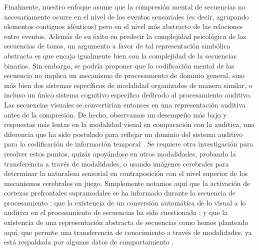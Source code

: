 Finalmente, nuestro enfoque asume que la compresión mental de secuencias no necesariamente ocurre en el nivel de los eventos sensoriales (es decir, agrupando elementos contiguos idénticos) pero en el nivel más abstracto de las relaciones entre eventos. Además de su éxito en predecir la complejidad psicológica de las secuencias de tonos, un argumento a favor de tal representación simbólica abstracta es que encaja igualmente bien con la complejidad de la secuencias binarias. Sin embargo, se podría proponer que la codificación mental de las secuencia no implica un mecanismo de procesamiento de dominio general, sino más bien dos sistemas específicos de modalidad organizados de manera similar, o incluso un único sistema cognitivo específica dedicado al procesamiento auditivo. Las secuencias visuales se convertirían entonces en una representación auditiva antes de la compresión. De hecho, observamos un desempeño más bajo y respuestas más lentas en la modalidad visual en comparación con la auditiva, una diferencia que ha sido postulado para reflejar un dominio del sistema auditivo para la codificación de información temporal \cite{f91,f118,f119}. Se requiere otra investigación para resolver estos puntos, quizás apoyándose en otros modalidades, probando la transferencia a través de modalidades, o usando imágenes cerebrales para determinar la naturaleza sensorial en contraposición con el nivel superior de los mecanismos cerebrales en juego. Simplemente notamos aquí que la activación de cortezas prefrontales supramodales se ha informado durante la secuencia de procesamiento \cite{f19,f60}; que la existencia de un conversión automática de lo visual a lo auditiva en el procesamiento de secuencias ha sido cuestionada \cite{f121}; y que la existencia de una representación abstracta de secuencias como hemos planteado aquí, que permite una transferencia de conocimiento a través de modalidades, ya está respaldada por algunos datos de comportamiento \cite{yildirim2015learning}.

